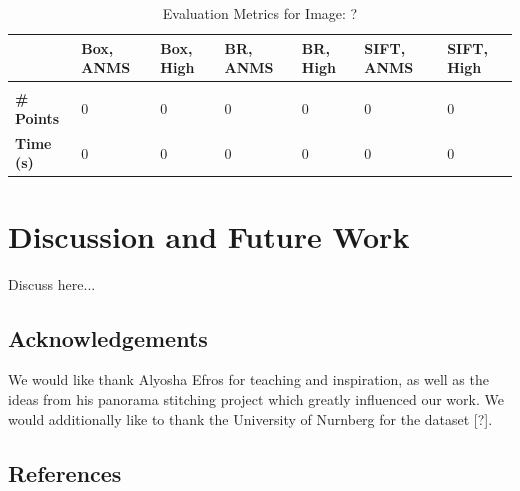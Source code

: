 \documentclass[12pt]{article}
\begin{document}
\begin{table}[t]
\caption{Evaluation Metrics for Image: ?}
\label{image}
\begin{center}
\begin{tabular}{l|llllll}
\multicolumn{1}{l}{} & \multicolumn{1}{l}{\bf Box, ANMS} & \multicolumn{1}{l}{\bf Box, High} & \multicolumn{1}{l}{\bf BR, ANMS} & \multicolumn{1}{l}{\bf BR, High} & \multicolumn{1}{l}{\bf SIFT, ANMS} & \multicolumn{1}{l}{\bf SIFT, High}
\\ \hline \\
{\bf \# Points} & 0 & 0 & 0 & 0 & 0 & 0 \\
{\bf Time (s)} & 0 & 0 & 0 & 0 & 0 & 0 \\
\end{tabular}
\end{center}
\end{table}

\section*{Discussion and Future Work}

Discuss here...

\subsection*{Acknowledgements}

We would like thank Alyosha Efros for teaching and inspiration, as well as the ideas from his panorama stitching project which greatly influenced our work. We would additionally like to thank the University of Nurnberg for the dataset [?].

\subsection*{References}
\end{document}
